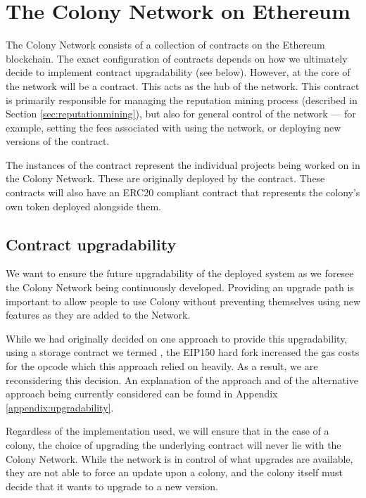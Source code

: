 \section{The Colony Network on Ethereum}\label{sec:colonynetwork}

The Colony Network consists of a collection of contracts on the Ethereum blockchain. The exact configuration of contracts depends on how we ultimately decide to implement contract upgradability (see below). However, at the core of the network will be a  contract. This acts as the hub of the network. This contract is primarily responsible for managing the reputation mining process (described in Section \ref{sec:reputationmining}), but also for general control of the network --- for example, setting the fees associated with using the network, or deploying new versions of the  contract.

The instances of the  contract represent the individual projects being worked on in the Colony Network. These are originally deployed by the  contract. These  contracts will also have an ERC20 compliant contract that represents the colony's own token deployed alongside them.

\subsection{Contract upgradability}

We want to ensure the future upgradability of the deployed system as we foresee the Colony Network being continuously developed. Providing an upgrade path is important to allow people to use Colony without preventing themselves using new features as they are added to the Network.

While we had originally decided on one approach to provide this upgradability, using a storage contract we termed , the EIP150 hard fork increased the gas costs for the  opcode which this approach relied on heavily. As a result, we are reconsidering this decision. An explanation of the  approach and of the alternative approach being currently considered can be found in Appendix \ref{appendix:upgradability}.

Regardless of the implementation used, we will ensure that in the case of a colony, the choice of upgrading the underlying  contract will never lie with the Colony Network. While the network is in control of what upgrades are available, they are not able to force an update upon a colony, and the colony itself must decide that it wants to upgrade to a new version.

